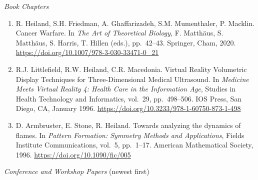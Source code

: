 \documentclass[11pt]{article}
\begin{document}
\textit{Book Chapters}

\begin{enumerate}[leftmargin=*, itemsep=3pt, topsep=4pt]
    \item R. Heiland, S.H. Friedman, A. Ghaffarizadeh, S.M. Mumenthaler, P. Macklin. Cancer Warfare. In \textit{The Art of Theoretical Biology}, F. Matth\"aus, S. Matth\"aus, S. Harris, T. Hillen (eds.), pp.\ 42--43. Springer, Cham, 2020. \url{https://doi.org/10.1007/978-3-030-33471-0_21}

    \item R.J. Littlefield, R.W. Heiland, C.R. Macedonia. Virtual Reality Volumetric Display Techniques for Three-Dimensional Medical Ultrasound. In \textit{Medicine Meets Virtual Reality 4: Health Care in the Information Age}, Studies in Health Technology and Informatics, vol.\ 29, pp.\ 498--506. IOS Press, San Diego, CA, January 1996. \url{https://doi.org/10.3233/978-1-60750-873-1-498}

    \item D. Armbruster, E. Stone, R. Heiland. Towards analyzing the dynamics of flames. In \textit{Pattern Formation: Symmetry Methods and Applications}, Fields Institute Communications, vol.\ 5, pp.\ 1--17. American Mathematical Society, 1996. \url{https://doi.org/10.1090/fic/005}
\end{enumerate}

\textit{Conference and Workshop Papers} (newest first)
\end{document}
